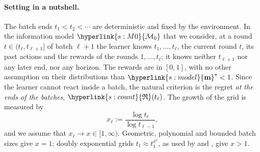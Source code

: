 \documentclass[10pt]{article}
\newcommand{\sy}[2]{{\hyperlink{#1}{#2}}}
\newcommand{\1}{\mathbf{1}}
\newcommand{\m}{\sy{s:model}{\mathbf{m}}}
\newcommand{\Reg}{\sy{s:count}{\mathfrak R}}
\newcommand{\Mz}{\sy{s:M0}{\mathcal M_0}}
\begin{document}
\paragraph{Setting in a nutshell.} The batch ends $t_1<t_2<\cdots$ are deterministic and fixed by the environment. In the information model $\Mz$ that we consider, at a round
$t\in(t_\ell,t_{\ell+1}]$ of batch $\ell+1$ the learner knows $t_1,\dots,t_\ell$, the current round $t$, its past actions and the rewards of the rounds $1,\dots,t_\ell$; it
knows neither $t_{\ell+1}$ nor any later end, nor any horizon. The rewards are in $[0,1]$, with no other assumption on their distributions than $\m^\star<1$. Since the
learner cannot react inside a batch, the natural criterion is the regret \emph{at the ends of the batches}, $\Reg(t_\ell)$. The growth of the grid is measured by
\[
x_\ell:=\frac{\log t_\ell}{\log t_{\ell-1}},
\]
and we assume that $x_\ell\to x\in[1,\infty)$. Geometric, polynomial and bounded batch sizes give $x=1$; doubly exponential grids $t_\ell\approx t_1^{x^\ell}$, as used
by \citet{PRCS16} and \citet{GHRZ19}, give $x>1$.
\end{document}
